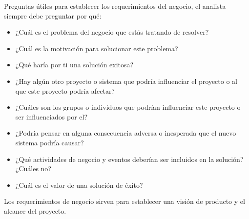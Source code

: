         Preguntas útiles para establecer los requerimientos del negocio, el analista siempre debe preguntar por qué:
        
        \begin{itemize}
            \item ¿Cuál es el problema del negocio que estás tratando de resolver?
            \item ¿Cuál es la motivación para solucionar este problema?
            \item ¿Qué haría por ti una solución exitosa?
            \item ¿Hay algún otro proyecto o sistema que podría influenciar el proyecto o al que este proyecto podría afectar?
            \item ¿Cuáles son los grupos o individuos que podrían influenciar este proyecto o ser influenciados por el?
            \item ¿Podría pensar en alguna consecuencia adversa o inesperada que el nuevo sistema podría causar?
            \item ¿Qué actividades de negocio y eventos deberían ser incluidos en la solución? ¿Cuáles no?
            \item ¿Cuál es el valor de una solución de éxito?
        \end{itemize}
        
        Los requerimientos de negocio sirven para establecer una visión de producto y el alcance del proyecto.
        
